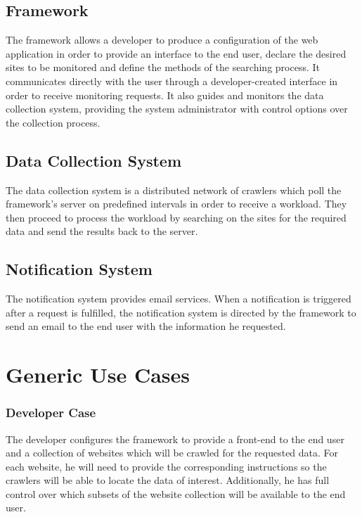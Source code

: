\documentclass[a4paper,10pt]{article} \usepackage{anysize}
\begin{document}
    \subsection{Framework}
        The framework allows a developer to produce a configuration of the
        web application in order to provide an interface to the end user,
        declare the desired sites to be monitored and define the methods of
        the searching process. It communicates directly with the user through a
        developer-created interface in order to receive monitoring requests.
        It also guides and monitors the data collection system, providing the
        system administrator with control options over the collection process.
    \subsection{Data Collection System}
        The data collection system is a distributed network of crawlers which
        poll the framework's server on predefined intervals in order to receive a
        workload. They then proceed to process the workload by searching on
        the sites for the required data and send the results back to the
        server. 
    \subsection{Notification System}
        The notification system provides email services. When a notification
        is triggered after a request is fulfilled, the notification system is
        directed by the framework to send an email to the end user with the
        information he requested.
        
\section{Generic Use Cases}
    \subsubsection{Developer Case}
        The developer configures the framework to provide a front-end to
        the end user and a collection of websites which will be crawled
        for the requested data. For each website, he will need to provide
        the corresponding instructions so the crawlers will be able to
        locate the data of interest. Additionally, he has full control
        over which subsets of the website collection will be available to
        the end user.
\end{document}

